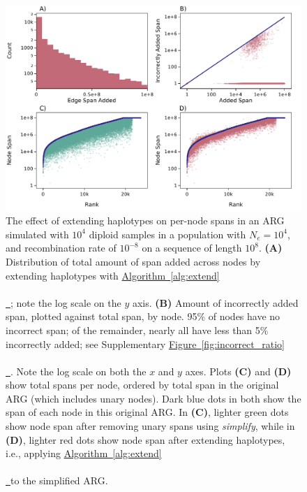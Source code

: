\documentclass[10pt,twoside,lineno]{gsajnl}
\newcommand{\algorithmref}[2][]{%
	\hyperref[{#2}]{%
		Algorithm~\ref*{#2}%
		\ifx\\#1\\%
		\else
		\,#1%
		\fi
	}%
}
\newcommand*{\figref}[2][]{%
	\hyperref[{#2}]{%
		Figure~\ref*{#2}%
		\ifx\\#1\\%
		\else
		\,#1%
		\fi
	}%
}
\begin{document}
\begin{figure}[!bht]
	\includegraphics[width=\textwidth]{figures/Figure4-plt.pdf}
	\caption{
        The effect of extending haplotypes on per-node spans
        in an ARG simulated with $10^4$ diploid samples in a population with $N_e=10^4$,
        and recombination rate of $10^{-8}$ on a sequence of length $10^8$.
        \textbf{(A)}
        Distribution of total amount of span added across nodes by 
        extending haplotypes with \algorithmref{alg:extend};
        note the log scale on the $y$ axis.
        \textbf{(B)}
        Amount of incorrectly added span, plotted against total span, by node.
        95\% of nodes have no incorrect span; of the remainder,
        nearly all have less than 5\% incorrectly added;
        see Supplementary \figref{fig:incorrect_ratio}. Note the log scale on both the $x$ and $y$ axes.
        Plots \textbf{(C)} and \textbf{(D)} show total spans per node,
        ordered by total span in the original ARG (which includes unary nodes).
        Dark blue dots in both show the span of each node in this original ARG.
        In \textbf{(C)}, lighter green dots show node
        span after removing unary spans using \textit{simplify},
        while in \textbf{(D)},
        lighter red dots show node span after extending haplotypes,
        i.e., applying \algorithmref{alg:extend} to the simplified ARG.
    }
	\label{fig:node-spans}
\end{figure}
\end{document}
